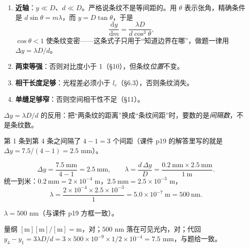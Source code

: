 \documentclass[11pt]{ctexart}
\begin{document}
\begin{enumerate}
\item \textbf{近轴}：$y\ll D$、$d\ll D$。严格说条纹不是等间距的。用 $\theta$ 表示张角，精确条件是 $d\sin\theta=m\lambda$，而 $y=D\tan\theta$，于是
\[
\frac{\mathrm{d}y}{\mathrm{d}m}=\frac{\lambda D}{d\cos^{3}\theta},
\]
$\cos\theta<1$ 使条纹变密——这条式子只用于“知道边界在哪”，做题一律用 $\Delta y=\lambda D/d$。
\item \textbf{两束等强}：否则对比度小于 1（\S10），但条纹\emph{位置}不变。
\item \textbf{相干长度足够}：光程差必须小于 $l_c$（\S6.3），否则条纹消失。
\item \textbf{单缝足够窄}：否则空间相干性不足（\S11）。
\end{enumerate}

\flowerrule
\qbreak
{}


$\Delta y=\lambda D/d$ 的反用：把“两条纹的距离”换成“条纹间距”时，要数的是\emph{间隔数}，不是条纹数。

第 1 条到第 4 条之间隔了 $4-1=3$ 个间距（课件 p19 的解答里写的就是 $\Delta y=7.5/(4-1)=2.5$ mm）。

\[
\Delta y=\frac{7.5\ \mathrm{mm}}{4-1}=2.5\ \mathrm{mm},
\qquad
\lambda=\frac{d\,\Delta y}{D}=\frac{0.2\ \mathrm{mm}\times2.5\ \mathrm{mm}}{1\ \mathrm{m}} .
\]
统一到米：$0.2\ \mathrm{mm}=2\times10^{-4}$ m，$2.5\ \mathrm{mm}=2.5\times10^{-3}$ m，
\[
\lambda=\frac{2\times10^{-4}\times2.5\times10^{-3}}{1}=5.0\times10^{-7}\ \mathrm{m}=500\ \mathrm{nm}.
\]

$\lambda=500$ nm（与课件 p19 方框一致）。

量纲 $[\mathrm{m}][\mathrm{m}]/[\mathrm{m}]=\mathrm{m}$，对；$500$ nm 落在可见光内，对；代回 $y_4-y_1=3\lambda D/d=3\times500\times10^{-9}\times1/2\times10^{-4}=7.5$ mm，与题给一致。

\flowerrule
\qbreak
{}

\end{document}
